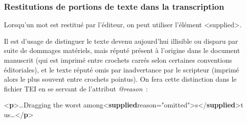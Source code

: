 \documentclass[]{beamer}\makeatletter
\begin{document}
\begin{frame}[fragile]
\end{frame}

\begin{frame}[fragile]
\frametitle{Restitutions de portions de texte dans la transcription}\par
Lorsqu’un mot est restitué par l’éditeur, on peut utiliser l’élément       {\color{blue2}<supplied>}.\par
Il est d’usage de distinguer le texte devenu aujourd’hui illisible ou      disparu par suite de dommages matériels, mais réputé présent à      l’origine dans le document manuscrit (qui est imprimé entre crochets      carrés selon certaines conventions éditoriales), et le texte réputé      omis par inadvertance par le scripteur (imprimé alors le plus souvent      entre crochets pointus). On fera cette distinction dans le fichier TEI      en se servant de l’attribut \emph{@reason} : 
\bgroup\ttfamily\fontsize{8.5pt}{9pt}\selectfont\par
\begin{exampleblock}{}
\noindent\ttfamily\mbox{}{\color{blue1}<\textbf{p}>}…Dragging the worst among{\color{blue1}<\textbf{supplied}\hspace*{6pt}reason="{\color{blue2}omitted}">}s{\color{blue1}</\textbf{supplied}>}t\mbox{}\newline 
 us…{\color{blue1}</\textbf{p}>}
\end{exampleblock}
\par\egroup
       
\end{frame}
\end{document}
